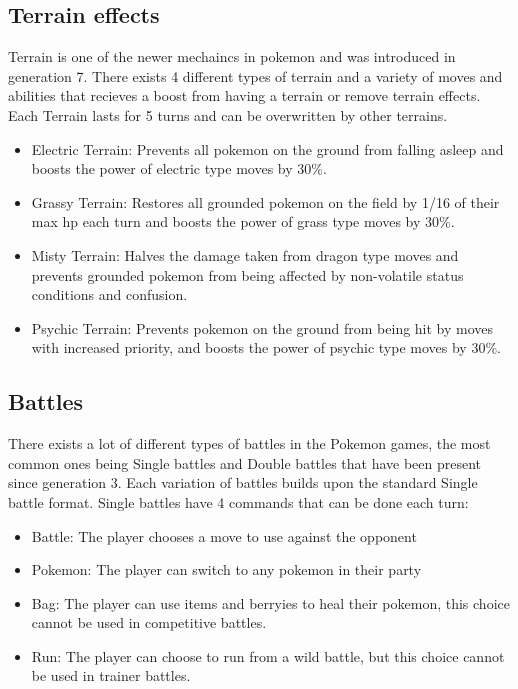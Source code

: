 \subsection{Terrain effects}
Terrain is one of the newer mechaincs in pokemon and was introduced in generation 7. There exists 4 different types of terrain and a variety of moves and abilities
that recieves a boost from having a terrain or remove terrain effects. Each Terrain lasts for 5 turns and can be overwritten by other terrains. \cite{Terrain}
\begin{itemize}
  \item Electric Terrain: Prevents all pokemon on the ground from falling asleep and boosts the power of electric type moves by 30\%.
  \item Grassy Terrain: Restores all grounded pokemon on the field by 1/16 of their max hp each turn and boosts the power of grass type moves by 30\%.
  \item Misty Terrain: Halves the damage taken from dragon type moves and prevents grounded pokemon from being affected by non-volatile status conditions and 
    confusion.
  \item Psychic Terrain: Prevents pokemon on the ground from being hit by moves with increased priority, and boosts the power of psychic type moves by 30\%.
\end{itemize}

\subsection{Battles}
There exists a lot of different types of battles in the Pokemon games, the most common ones being Single battles and Double battles that have been present 
since generation 3. Each variation of battles builds upon the standard Single battle format. Single battles have 4 commands that can be done each turn:
\cite{PokemonBattles}
\begin{itemize}
  \item Battle: The player chooses a move to use against the opponent
  \item Pokemon: The player can switch to any pokemon in their party 
  \item Bag: The player can use items and berryies to heal their pokemon, this choice cannot be used in competitive battles.
  \item Run: The player can choose to run from a wild battle, but this choice cannot be used in trainer battles.
\end{itemize}
